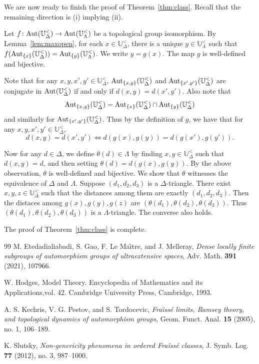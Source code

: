 \documentclass[10pt,a4paper]{amsart}
\theoremstyle{definition}
\theoremstyle{remark}
\begin{document}
     We are now ready to finish the proof of Theorem~\ref{thm:class}. Recall that the remaining direction is (i) implying (ii).

        Let $f\colon \mbox{\rm Aut}(\mathbb{U}^<_\Delta)\to\mbox{\rm Aut}(\mathbb{U}^<_\Lambda)$ be a topological group isomorphism. By Lemma~\ref{lem:maxopen}, for each $x \in \mathbb{U}_{\Delta}^<$, there is a unique $y \in \mathbb{U}_{\Lambda}^<$ such that $f({\rm Aut}_{\{x\}}(\mathbb{U}_{\Delta}^<))={\rm Aut}_{\{y\}}(\mathbb{U}_{\Lambda}^<)$. We write $y=g(x)$. The map $g$ is well-defined and bijective. 

        Note that for any $x,y,x',y'\in\mathbb{U}_{\Delta}^<$, ${\rm Aut}_{\{x,y\}}(\mathbb{U}_{\Delta}^<)$ and ${\rm Aut}_{\{x',y'\}}(\mathbb{U}_{\Delta}^<)$ are conjugate in $\mbox{\rm Aut}(\mathbb{U}^<_\Delta)$ if and only if $d(x,y)=d(x',y')$. Also note that
$$ {\rm Aut}_{\{x,y\}}(\mathbb{U}_{\Delta}^<)=\mbox{\rm Aut}_{\{x\}}(\mathbb{U}^<_\Delta)\cap \mbox{\rm Aut}_{\{y\}}(\mathbb{U}^<_\Delta) $$
and similarly for $\mbox{\rm Aut}_{\{x',y'\}}(\mathbb{U}^<_\Delta)$. Thus by the definition of $g$, we have that for any $x,y,x',y' \in \mathbb{U}_{\Delta}^<$,
$$ d(x,y)=d(x',y') \iff d(g(x),g(y)) = d(g(x'),g(y')).$$
        
Now for any $d \in \Delta$, we define $\theta(d) \in \Lambda$ by finding $x,y \in \mathbb{U}_{\Delta}^<$ such that $d(x,y)=d$, and then setting $\theta(d)=d(g(x),g(y))$. By the above observation, $\theta$ is well-defined and bijective. We show that $\theta$ witnesses the equivalence of $\Delta $ and $ \Lambda$. Suppose $(d_1,d_2,d_3)$ is a $\Delta$-triangle. There exist $x,y,z \in \mathbb{U}_{\Delta}^<$ such that the distances among them are exactly $(d_1,d_2,d_3)$. Then the distaces among $g(x),g(y),g(z)$ are $(\theta(d_1),\theta(d_2),\theta(d_3))$. Thus $(\theta(d_1),\theta(d_2),\theta(d_3))$ is a $\Lambda$-triangle. The converse also holds.

The proof of Theorem~\ref{thm:class} is complete.

\begin{thebibliography}{99}
M. Etedadialiabadi, S. Gao, F. Le Ma\^{\i}tre, and J. Melleray,
\textit{Dense locally finite subgroups of automorphism groups of ultraextensive spaces},
Adv. Math. {\bf 391} (2021), 107966.

W. Hodges, 
Model Theory. Encyclopedia of Mathematics and its Applications,vol. 42.
 Cambridge University Press, Cambridge, 1993.

A. S. Kechris, V. G. Pestov, and S. Tordocevic,
\textit{Fra\"{\i}ss\'{e} limits, Ramsey theory, and topological dynamics of automorphism groups},
Geom. Funct. Anal. {\bf 15} (2005), no. 1, 106--189.

K. Slutsky,
\textit{Non-genericity phenomena in ordered Fra\"iss\'e classes},
J. Symb. Log. {\bf 77} (2012), no. 3, 987--1000.
\end{thebibliography}
\end{document}
